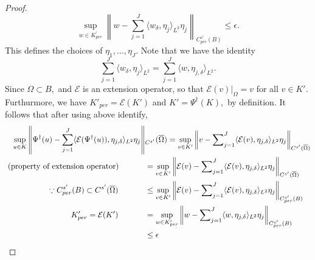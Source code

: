 \documentclass[reqno,9pt]{amsart}
\theoremstyle{plain}
\theoremstyle{definition}
\newcommand{\cal}[1]{\mathcal{#1}}
\begin{document}
\begin{proof}
    $$ \sup\limits_{w \in K^{'}_{per}} \left\|w - \sum_{j=1}^J \langle w_\delta,\eta_j\rangle_{L^2}\eta_j\right\|_{C^{s'}_{per}(B)} \leq \epsilon. $$ This defines the choices of $\eta_1, \dots, \eta_J$. Note that we have the identity
    $$ \sum\limits_{j=1}^{J}\langle w_\delta,\eta_j\rangle_{L^2} = \sum\limits_{j=1}^{J}\langle w,\eta_{j,\delta}\rangle_{L^2}.$$
    Since $\Omega \subset B,$ and $\cal E$ is an extension operator, so that $\cal E(v)|_{\Omega} = v$ for all $v \in K'$. Furthurmore, we have $K'_{per} = \cal E(K')$ and $K' = \Psi^\dag(K),$ by definition. It follows that after using above identify,
    {\small $$
    \begin{aligned}
    \sup\limits_{u \in K} \left\|\Psi^\dag(u) - \sum_{j=1}^{J} \langle \cal E (\Psi^\dag(u)),\eta_{j,\delta} \rangle_{L^2} \eta_j \right\|&_{C^{s'}}(\overline{\Omega}) = \sup\limits_{v \in K'} \left\|v - \sum\nolimits_{j=1}^{J} \langle \cal E (v),\eta_{j,\delta} \rangle_{L^2} \eta_j \right\|_{C^{s'}(\overline{\Omega})} \\
    \text{ (property of extension operator) } \hspace{3em}&= \sup\limits_{v \in K'} \left\|\cal E(v) - \sum\nolimits_{j=1}^{J} \langle \cal E (v),\eta_{j,\delta} \rangle_{L^2} \eta_j \right\|_{C^{s'}(\overline{\Omega})} \\
    \because C^{s'}_{per}(B) \subset C^{s'}(\overline{\Omega}) \hspace{3.4em} &\leq \sup\limits_{v \in K'} \left\|\cal E(v) - \sum\nolimits_{j=1}^{J} \langle \cal E (v),\eta_{j,\delta} \rangle_{L^2} \eta_j \right\|_{C^{s'}_{per}(B)} \\
    K'_{per} = \cal E (K') \hspace{3.4em}&= \sup\limits_{w \in K'_{per}} \left\|w - \sum\nolimits_{j=1}^{J} \langle w,\eta_{j,\delta} \rangle_{L^2} \eta_j \right\|_{C^{s'}_{per}(B)} \\ &\leq \epsilon
    \end{aligned}
    $$}

\end{proof}
\end{document}
